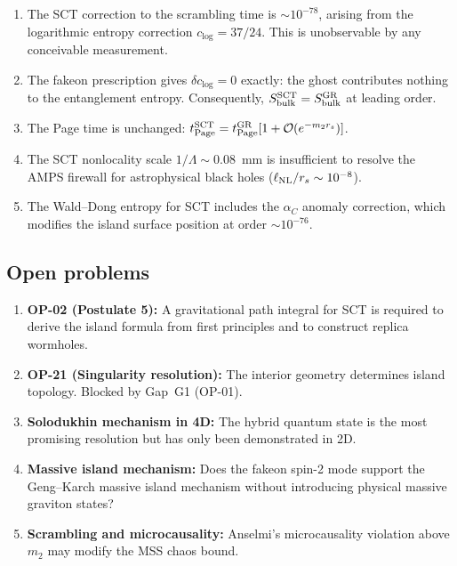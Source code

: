 \documentclass[11pt,a4paper]{article}
\renewcommand{\order}{\mathcal{O}}
\theoremstyle{plain}
\theoremstyle{definition}
\begin{document}
\begin{enumerate}
\item The SCT correction to the scrambling time is $\sim 10^{-78}$,
      arising from the logarithmic entropy correction $c_{\log} = 37/24$.
      This is unobservable by any conceivable measurement.

\item The fakeon prescription gives $\delta c_{\log} = 0$ exactly:
      the ghost contributes nothing to the entanglement entropy.
      Consequently, $S_{\rm bulk}^{\rm SCT} = S_{\rm bulk}^{\rm GR}$
      at leading order.

\item The Page time is unchanged: $t_{\rm Page}^{\rm SCT}
      = t_{\rm Page}^{\rm GR}[1 + \order(e^{-m_2 r_s})]$.

\item The SCT nonlocality scale $1/\Lambda \sim 0.08$~mm is
      insufficient to resolve the AMPS firewall for astrophysical
      black holes ($\ell_{\rm NL}/r_s \sim 10^{-8}$).

\item The Wald--Dong entropy for SCT includes the $\alpha_C$ anomaly
      correction, which modifies the island surface position at
      order $\sim 10^{-76}$.
\end{enumerate}

\subsection{Open problems}

\begin{enumerate}
\item \textbf{OP-02 (Postulate 5):} A gravitational path integral
      for SCT is required to derive the island formula from first
      principles and to construct replica wormholes.

\item \textbf{OP-21 (Singularity resolution):} The interior geometry
      determines island topology.  Blocked by Gap~G1 (OP-01).

\item \textbf{Solodukhin mechanism in 4D:} The hybrid quantum state
      is the most promising resolution but has only been demonstrated
      in 2D.

\item \textbf{Massive island mechanism:} Does the fakeon spin-2 mode
      support the Geng--Karch massive island mechanism without
      introducing physical massive graviton states?

\item \textbf{Scrambling and microcausality:} Anselmi's microcausality
      violation above $m_2$ may modify the MSS chaos bound.
\end{enumerate}
\end{document}

